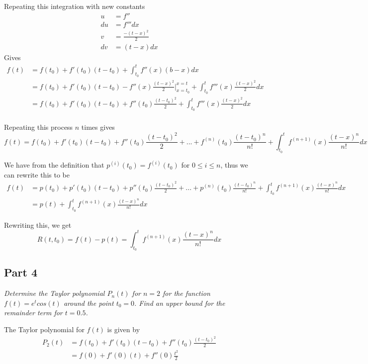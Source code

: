 Repeating this integration with new constants
\begin{align*}
    u &= f'' \\
    du &= f''' dx \\
    v &= \frac{-(t - x)^2}{2} \\
    dv &= (t - x) dx 
\end{align*}
Gives
\begin{align*}
    f(t) &= f(t_0) + f'(t_0)(t - t_0) + \int_{t_0}^t f''(x)(b - x) dx \\
        &= f(t_0) + f'(t_0)(t - t_0) - f''(x)\frac{(t - x)^2}{2} |_{x=t_0}^{x=t} + \int_{t_0}^t f'''(x)\frac{(t - x)^2}{2} dx \\
        &= f(t_0) + f'(t_0)(t - t_0) + f''(t_0)\frac{(t - t_0)^2}{2} + \int_{t_0}^t f'''(x)\frac{(t - x)^2}{2} dx \\
\end{align*}

Repeating this process $n$ times gives 
\begin{equation*}
    f(t) = f(t_0) + f'(t_0)(t - t_0) + f''(t_0)\frac{(t - t_0)^2}{2} + ... + f^{(n)}(t_0) \frac{(t - t_0)^n}{n!} + \int_{t_0}^t f^{(n + 1)}(x) \frac{(t - x)^n}{n!} dx
\end{equation*}

We have from the definition that $p^{(i)}(t_0) = f^{(i)}(t_0)$ for $0 \le i \le n$, thus we can rewrite this to be
\begin{align*}
    f(t) &= p(t_0) + p'(t_0)(t - t_0) + p''(t_0)\frac{(t - t_0)^2}{2} + ... + p^{(n)}(t_0) \frac{(t - t_0)^n}{n!} + \int_{t_0}^t f^{(n + 1)}(x) \frac{(t - x)^n}{n!} dx \\
        &= p(t) + \int_{t_0}^t f^{(n + 1)}(x) \frac{(t - x)^n}{n!} dx
\end{align*}

Rewriting this, we get
\begin{equation}
    R(t, t_0) = f(t) - p(t) = \int_{t_0}^t f^{(n + 1)}(x) \frac{(t - x)^n}{n!} dx
\end{equation}




\subsection{Part 4}
\textit{Determine the Taylor polynomial $P_n(t)$ for $n = 2$ for the function $f(t) = e^{t}cos(t)$ around the point $t_0 = 0$. Find an upper bound for the remainder term for $t = 0.5$.}

The Taylor polynomial for $f(t)$ is given by
\begin{align*}
    P_2(t) &= f(t_0) + f'(t_0) (t - t_0) + f''(t_0) \frac{(t - t_0)^2}{2} \\
        &= f(0) + f'(0) (t) + f''(0) \frac{t^2}{2}
\end{align*}


